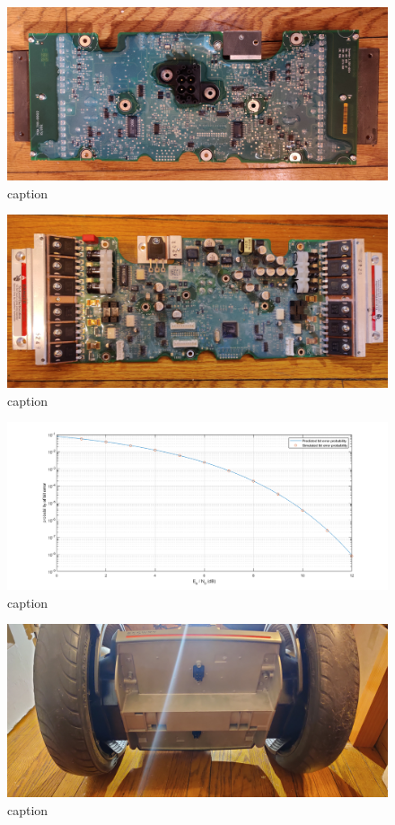 \documentclass[]{formalLabReport}
\begin{document}
\begin{figure}
    \includegraphics[]{entireBoardBottom.jpg}
    \caption{caption}
    \label{fig:entireBoardBottom.jpg}
\end{figure}

\begin{figure}
    \includegraphics[]{entireBoardTop.jpg}
    \caption{caption}
    \label{fig:entireBoardTop.jpg}
\end{figure}

\begin{figure}
    \includegraphics[]{report.png}
    \caption{caption}
    \label{fig:report.png} 
\end{figure}

\begin{figure}
    \includegraphics[]{segwayBottom.jpg}
    \caption{caption}
    \label{fig:segwayBottom.jpg}
\end{figure}
\end{document}

